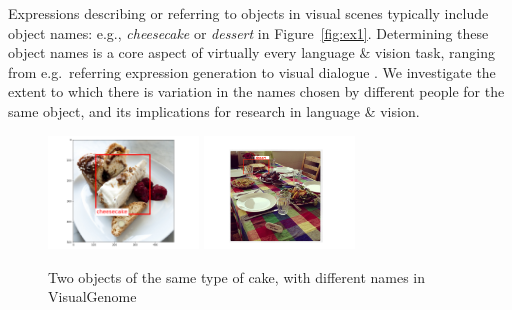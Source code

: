 Expressions describing or referring to objects in visual scenes typically include object names: e.g.,  \emph{cheesecake} or  \emph{dessert}  in Figure~\ref{fig:ex1}.
Determining these object names is a core aspect of virtually every language \& vision task, ranging from e.g.\ referring expression generation to visual dialogue \cite{add-refs}.
We investigate the extent to which there is variation in the names chosen by different people for the same object, and its implications for research in language \& vision.

\begin{figure}[htbp]
\begin{center}
\includegraphics[height=3cm]{figures/cheesecake.png}
\includegraphics[height=3cm]{figures/cheesecak2.pdf}
\caption{Two objects of the same type of cake, with different names in VisualGenome}
\label{fig:cake}
\end{center}
\end{figure}

